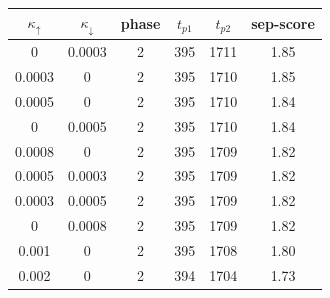 \begin{tabular}{@{}cccccc@{}}
\toprule
$\kappa_{\uparrow}$ & $\kappa_{\downarrow}$ & phase & $t_{p1}$ & $t_{p2}$ & sep-score \\
\midrule
0 & 0.0003 & 2 & 395 & 1711 & 1.85 \\
0.0003 & 0 & 2 & 395 & 1710 & 1.85 \\
0.0005 & 0 & 2 & 395 & 1710 & 1.84 \\
0 & 0.0005 & 2 & 395 & 1710 & 1.84 \\
0.0008 & 0 & 2 & 395 & 1709 & 1.82 \\
0.0005 & 0.0003 & 2 & 395 & 1709 & 1.82 \\
0.0003 & 0.0005 & 2 & 395 & 1709 & 1.82 \\
0 & 0.0008 & 2 & 395 & 1709 & 1.82 \\
0.001 & 0 & 2 & 395 & 1708 & 1.80 \\
0.002 & 0 & 2 & 394 & 1704 & 1.73 \\
\bottomrule
\end{tabular}
